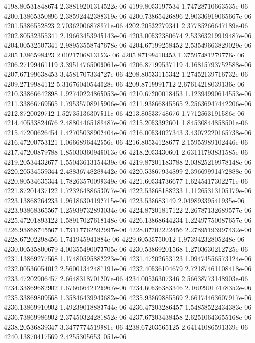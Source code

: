 {4198.80531848674 2.38819201314522e-06
4199.8053197534 1.74728710663535e-06
4200.13865350896 2.38592442388319e-06
4200.73865426896 2.90336919065667e-06
4201.5386552823 2.70362006878871e-06
4202.20532279341 2.37785266647189e-06
4202.80532355341 2.19663453945143e-06
4203.00532380674 2.53363219919487e-06
4204.00532507341 2.98953558747678e-06
4204.67199258452 2.53549663829029e-06
4205.1386598423 2.0021706813153e-06
4205.87199410453 1.37597481279776e-06
4206.27199461119 3.39514765009061e-06
4206.87199537119 4.16815793752588e-06
4207.67199638453 3.4581707334727e-06
4208.80533115342 1.27452139716732e-06
4209.2719984112 5.31676040544028e-06
4209.8719991712 2.67614218039136e-06
4210.33866642898 1.92740224865053e-06
4210.67200018453 1.12394990614553e-06
4211.33866769565 1.79535708915906e-06
4211.93866845565 2.25636947442206e-06
4212.8720029712 1.52735136307511e-06
4213.80533748676 1.7712563191586e-06
4214.40533824676 2.48804465188487e-06
4215.2053392601 1.84530844858501e-06
4215.47200626454 1.42705038902404e-06
4216.00534027343 3.43072220165738e-06
4216.47200753121 1.0666896442556e-06
4216.80534128677 2.15955989102446e-06
4217.47200879788 1.85030360946013e-06
4218.2053430601 2.63111793831585e-06
4219.20534432677 1.55043613154439e-06
4219.87201183788 2.03825219978148e-06
4220.20534559344 2.48836748289442e-06
4220.53867934899 2.39669991472888e-06
4220.80534635344 1.78263570099349e-06
4221.60534736677 1.6245417302271e-06
4221.87201437122 1.72326488653077e-06
4222.53868188233 1.11265313105179e-06
4223.13868264233 1.96186304192715e-06
4223.538683149 2.04989339541935e-06
4223.93868365567 1.25939732893034e-06
4224.87201817122 2.26787132689577e-06
4225.47201893122 1.58917027618148e-06
4226.13868644234 1.22497750087657e-06
4226.93868745567 1.73117762592997e-06
4228.07202222456 2.27895193997432e-06
4228.67202298456 1.741945941884e-06
4229.60535750012 1.97394232805248e-06
4230.00535800679 4.00355490073705e-06
4230.53869201568 1.2703630212725e-06
4231.13869277568 1.17480595882223e-06
4231.47202653123 1.09474556573124e-06
4232.00536054012 2.56001342487191e-06
4232.40536104679 2.72187461108418e-06
4233.47202906457 2.6648318701207e-06
4234.00536307346 2.56638773148903e-06
4234.33869682902 1.67666642126967e-06
4234.60536383346 2.16029017478352e-06
4235.33869809568 1.35846439943682e-06
4235.93869885569 2.66174463607917e-06
4236.13869910902 1.49239018883744e-06
4236.47203286457 1.54858522434383e-06
4236.73869986902 2.37450324281852e-06
4237.67203438458 2.62510643655168e-06
4238.20536839347 3.3477774519981e-06
4238.67203565125 2.64141086591339e-06
4240.13870417569 2.42553056531051e-06
}
